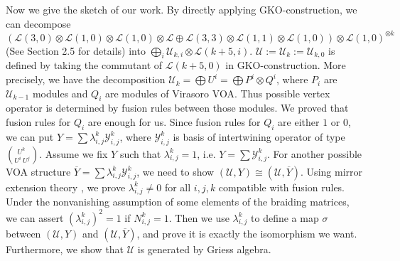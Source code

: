 \documentclass{article}
\newcommand{\ito}[3]{\left(^{\ \ {#3}}_{{#1}\ {#2}}\right)}
\begin{document}
	
	Now we give the sketch of our work. 
	By directly applying GKO-construction,
	we can decompose 
	$$\left(\mathcal{L}\left(3,0\right)\otimes\mathcal{L}\left(1,0\right)\otimes\mathcal{L}\left(1,0\right)\otimes\mathcal{L}\oplus\mathcal{L}\left(3,3\right)\otimes\mathcal{L}\left(1,1\right)\otimes\mathcal{L}\left(1,0\right)\right)\otimes\mathcal{L}(1,0)^{\otimes k}$$
	(See Section 2.5 for details) into
	$\bigoplus_{i}\mathcal{U}_{k,i}\otimes \mathcal{L}(k+5,i)$.
	$\mathcal{U}:=\mathcal{U}_k:=\mathcal{U}_{k,0}$ is defined by taking the commutant of $\mathcal{L}(k+5,0)$ in GKO-construction.%
	More precisely, we have the decomposition
	$\mathcal{U}_k=\bigoplus U^i=\bigoplus P^i\otimes Q^i$,
	where $P_i$ are $\mathcal{U}_{k-1}$ modules and $Q_i$ are modules of Virasoro VOA. 
	Thus possible vertex operator is determined by fusion rules between those modules.
	We proved that fusion rules for $Q_i$ are enough for us.
	Since fusion rules for $Q_i$ are either $1$ or $0$, 
	we can put $Y=\sum \lambda_{i,j}^k \mathcal{Y}_{i,j}^k$,
	where $\mathcal{Y}_{i,j}^k$ is basis of intertwining operator of type 
	$\ito{U^i}{U^j}{U^k}$.
	Assume we fix $Y$ such that $\lambda_{i,j}^k=1$, i.e. $Y=\sum \mathcal{Y}_{i,j}^k$. For another possible VOA structure $\overline{Y}=\sum \lambda_{i,j}^k \mathcal{Y}_{i,j}^k$,
	we need to show $(\mathcal{U},Y)\cong(\mathcal{U},\overline{Y})$.
	Using mirror extension theory \cite{Lin}, we prove $\lambda_{i,j}^k\neq 0$ for all $i,j,k$ compatible with fusion rules.
	Under the nonvanishing assumption of some elements of the braiding matrices,
	we can assert $\left(\lambda_{i,j}^k\right)^2=1$ if $N_{i,j}^k=1$.
	Then we use $\lambda_{i,j}^k$ to define a map $\sigma$ between $(\mathcal{U},Y)$ and $(\mathcal{U},\overline{Y})$,
	and prove it is exactly the isomorphism we want.
	Furthermore, we show that $\mathcal{U}$ is generated by Griess algebra.
	
\end{document}
